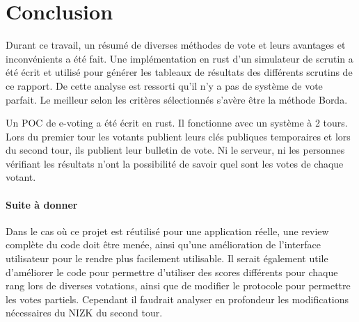 \documentclass[../report]{subfiles}
\begin{document}
\section{Conclusion}

Durant ce travail, un résumé de diverses méthodes de vote et leurs avantages et inconvénients a été fait.
Une implémentation en rust d'un simulateur de scrutin a été écrit et utilisé pour générer les tableaux
de résultats des différents scrutins de ce rapport.
De cette analyse est ressorti qu'il n'y a pas de système de vote parfait. Le meilleur selon les critères sélectionnés s'avère être la méthode Borda.

Un POC de e-voting a été écrit en rust. Il fonctionne avec un système à 2 tours. Lors du premier tour
les votants publient leurs clés publiques temporaires et lors du second tour, ils publient leur bulletin de vote.
Ni le serveur, ni les personnes vérifiant les résultats n'ont la possibilité de savoir quel sont les votes de chaque votant.

\paragraph{Suite à donner}

Dans le cas où ce projet est réutilisé pour une application réelle, une review complète du code doit être menée, ainsi
qu'une amélioration de l'interface utilisateur pour le rendre plus facilement utilisable.
Il serait également utile d'améliorer le code pour permettre d'utiliser des scores différents pour chaque rang lors de diverses votations, 
ainsi que de modifier le protocole pour permettre les votes partiels. Cependant il faudrait 
analyser en profondeur les modifications nécessaires du NIZK du second tour.
\end{document}
